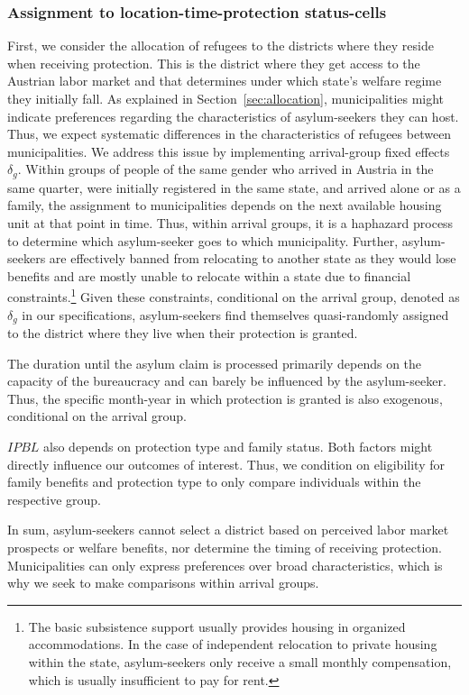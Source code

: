 \subsubsection{Assignment to location-time-protection status-cells} \label{identification_cells}

First, we consider the allocation of refugees to the districts where they reside when receiving protection. This is the district where they get access to the Austrian labor market and that determines under which state's welfare regime they initially fall. As explained in Section~\ref{sec:allocation}, municipalities might indicate preferences regarding the characteristics of asylum-seekers they can host. Thus, we expect systematic differences in the characteristics of refugees between municipalities. We address this issue by implementing arrival-group fixed effects $\delta_g$. Within groups of people of the same gender who arrived in Austria in the same quarter, were initially registered in the same state, and arrived alone or as a family, the assignment to municipalities depends on the next available housing unit at that point in time. Thus, within arrival groups, it is a haphazard process to determine which asylum-seeker goes to which municipality. Further, asylum-seekers are effectively banned from relocating to another state as they would lose benefits and are mostly unable to relocate within a state due to financial constraints.\footnote{The basic subsistence support usually provides housing in organized accommodations. In the case of independent relocation to private housing within the state, asylum-seekers only receive a small monthly compensation, which is usually insufficient to pay for rent.} Given these constraints, conditional on the arrival group, denoted as $\delta_{g}$ in our specifications, asylum-seekers find themselves quasi-randomly assigned to the district where they live when their protection is granted.

The duration until the asylum claim is processed primarily depends on the capacity of the bureaucracy and can barely be influenced by the asylum-seeker. Thus, the specific month-year in which protection is granted is also exogenous, conditional on the arrival group.

$IPBL$ also depends on protection type and family status. Both factors might directly influence our outcomes of interest. Thus, we condition on eligibility for family benefits and protection type to only compare individuals within the respective group.

In sum, asylum-seekers cannot select a district based on perceived labor market prospects or welfare benefits, nor determine the timing of receiving protection. Municipalities can only express preferences over broad characteristics, which is why we seek to make comparisons within arrival groups.

